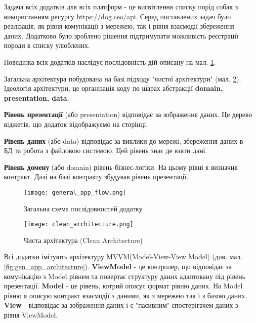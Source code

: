 Задача всіх додатків для всіх платформ - це висвітлення списку порід собак з використанням ресурсу https://dog.ceo/api.
Серед поставлених задач було реалізація, як рівня комунікації з мережею, так і рівня взаємодії збереження
даних. Додатково було зроблено рішення підтримувати можливість реєстрації породи в списку улюблених.

Поведінка всіх додатків наслідує послідовність дій описану на мал. \ref{fig:gen_app_flow}.

Загальна архітектура побудована на базі підходу "чистої архітектури" (мал. \ref{fig:clean_architecture}).
Ідеологія архітектури, це організація коду по шарах абстракції \textbf{domain, presentation, data}.

\textbf{Рівень презентації} (або presentation) відповідає за зображення даних. Це дерево віджетів,
що додаток відображуємо на сторінці.

\textbf{Рівень даних} (або data) відповідає за виклики до мережі, збереження даних в БД та робота з файловою системою.
Цей рівень знає де взяти дані.

\textbf{Рівень домену} (або domain) рівень бізнес-логіки. На цьому рівні я визначив контракт. Далі на базі контракту
збудував рівень презентації.

\begin{figure}
    \begin{center}
        \texttt{[image: general\_app\_flow.png]}
        \caption{Загальна схема послідовностей додатку}
        \label{fig:gen_app_flow}
    \end{center}
\end{figure}

\begin{figure}
    \begin{center}
        \texttt{[image: clean\_architecture.png]}
        \caption{Чиста архітектура (Clean Architecture)}
        \label{fig:clean_architecture}
    \end{center}
\end{figure}

Всі додатки імітують архітектуру MVVM(Model-View-View Model) (див. мал. \ref{fig:gen_app_architecture}).
\textbf{ViewModel} - це контролер, що відповідає за комунікацію з Model рівнем та повертає структуру даних адаптовану під рівень презентації.
\textbf{Model} - це рівень, котрий описує формат рівню даних. На Model рівню я описую контракт взаємодії з даними, як з
мережею так і з базою даних.
\textbf{View} - відповідає за зображення даних і є "пасивним" спостерігачем даних з рівня ViewModel.

